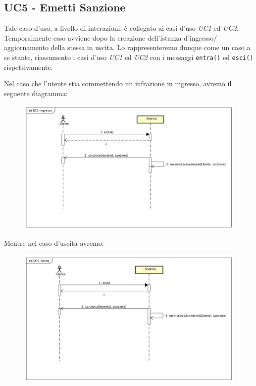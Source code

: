 \documentclass[12pt, letterpaper]{article}
\begin{document}
\subsection{UC5 - Emetti Sanzione}
Tale caso d'uso, a livello di interazioni,
è collegato ai casi d'uso \emph{UC1} ed 
\emph{UC2}. Temporalmente esso avviene 
dopo la creazione dell'istanza d'ingresso/
aggiornamento della stessa in uscita.
Lo rappresenteremo dunque come un caso a 
se stante, riassumento i casi d'uso \emph{UC1}
ed \emph{UC2} con i messaggi \texttt{entra()} ed 
\texttt{esci()} rispettivamente.

\noindent
Nel caso che l'utente stia commettendo un 
infrazione in ingresso, avremo il seguente
diagramma:
\begin{figure}[H]
    \centering
    \includegraphics[scale=0.40]{UC5-Ingresso}
\end{figure} 

\noindent
Mentre nel caso d'uscita avremo:
\begin{figure}[H]
    \centering
    \includegraphics[scale=0.40]{UC5-Uscita}
\end{figure} 
\end{document}
